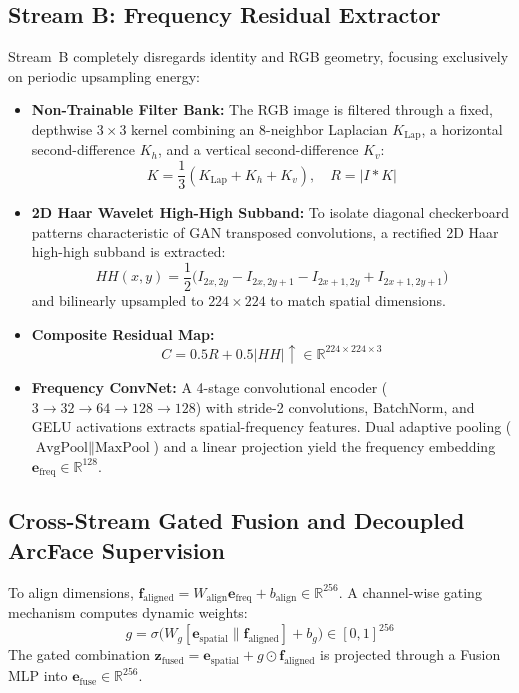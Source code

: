 \documentclass[11pt,a4paper]{article}
\begin{document}
\subsection{Stream B: Frequency Residual Extractor}
Stream~B completely disregards identity and RGB geometry, focusing exclusively on periodic upsampling energy:
\begin{itemize}[leftmargin=*]
    \item \textbf{Non-Trainable Filter Bank:} The RGB image is filtered through a fixed, depthwise $3 \times 3$ kernel combining an 8-neighbor Laplacian $K_{\text{Lap}}$, a horizontal second-difference $K_h$, and a vertical second-difference $K_v$:
    \begin{equation}
        K = \frac{1}{3} (K_{\text{Lap}} + K_h + K_v), \quad R = |I * K|
    \end{equation}
    \item \textbf{2D Haar Wavelet High-High Subband:} To isolate diagonal checkerboard patterns characteristic of GAN transposed convolutions, a rectified 2D Haar high-high subband is extracted:
    \begin{equation}
        HH(x, y) = \frac{1}{2} \Big( I_{2x, 2y} - I_{2x, 2y+1} - I_{2x+1, 2y} + I_{2x+1, 2y+1} \Big)
    \end{equation}
    and bilinearly upsampled to $224 \times 224$ to match spatial dimensions.
    \item \textbf{Composite Residual Map:}
    \begin{equation}
        C = 0.5 R + 0.5 |HH|\uparrow \in \mathbb{R}^{224 \times 224 \times 3}
    \end{equation}
    \item \textbf{Frequency ConvNet:} A 4-stage convolutional encoder ($3 \to 32 \to 64 \to 128 \to 128$) with stride-2 convolutions, BatchNorm, and GELU activations extracts spatial-frequency features. Dual adaptive pooling ($\text{AvgPool} \parallel \text{MaxPool}$) and a linear projection yield the frequency embedding $\mathbf{e}_{\text{freq}} \in \mathbb{R}^{128}$.
\end{itemize}

\subsection{Cross-Stream Gated Fusion and Decoupled ArcFace Supervision}
To align dimensions, $\mathbf{f}_{\text{aligned}} = W_{\text{align}} \mathbf{e}_{\text{freq}} + b_{\text{align}} \in \mathbb{R}^{256}$. A channel-wise gating mechanism computes dynamic weights:
\begin{equation}
    g = \sigma\Big( W_g [\mathbf{e}_{\text{spatial}} \parallel \mathbf{f}_{\text{aligned}}] + b_g \Big) \in [0, 1]^{256}
\end{equation}
The gated combination $\mathbf{z}_{\text{fused}} = \mathbf{e}_{\text{spatial}} + g \odot \mathbf{f}_{\text{aligned}}$ is projected through a Fusion MLP into $\mathbf{e}_{\text{fuse}} \in \mathbb{R}^{256}$.
\end{document}

